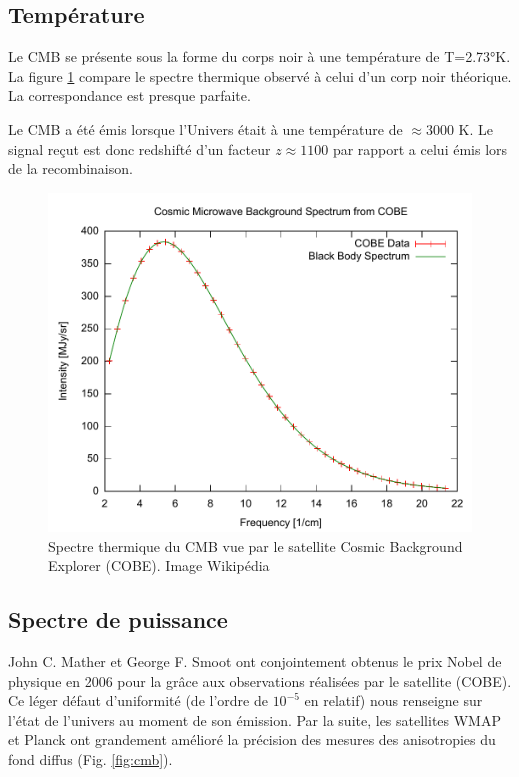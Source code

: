 \subsection{Température}
Le \ac{CMB} se présente sous la forme du corps noir à une température de T=2.73°K.
La figure \ref{fig:cmb_thermal_spectrum} compare le spectre thermique observé à celui d'un corp noir théorique. 
La correspondance est presque parfaite.

Le \ac{CMB} a été émis lorsque l'Univers était à une température de $\approx 3000$ K.
Le signal reçut est donc redshifté d'un facteur $z\approx1100$ par rapport a celui émis lors de la recombinaison.

\begin{figure}[htbp]
        \includegraphics[width=.95\linewidth]{img/01/Cmbr.pdf} 
        \caption{Spectre thermique du \ac{CMB} vue par le satellite Cosmic Background Explorer (COBE). 
        Image Wikipédia
 		\label{fig:cmb_thermal_spectrum}}
\end{figure}

\subsection{Spectre de puissance}

John C. Mather et George F. Smoot ont conjointement obtenus le prix Nobel de physique en 2006 pour la \cite{CMBanisotropiesNobel} grâce aux observations réalisées par le satellite  (COBE).
Ce léger défaut d'uniformité (de l'ordre de $10^{-5}$ en relatif) nous renseigne sur l’état de l'univers au moment de son émission.
Par la suite, les satellites WMAP et Planck ont grandement amélioré la précision des mesures des anisotropies du fond diffus (Fig. \ref{fig:cmb}).

